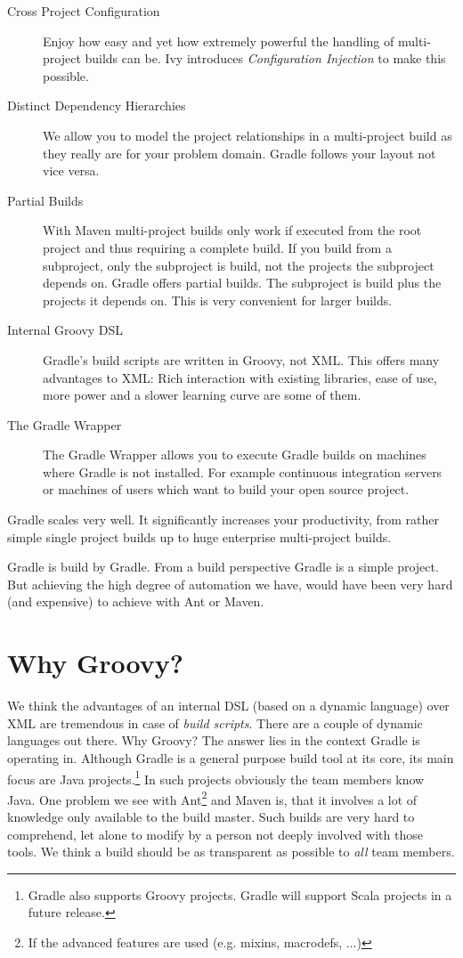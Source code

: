 \begin{description}
	\item[Cross Project Configuration] Enjoy how easy and yet how extremely powerful the handling of multi-project builds can be. Ivy introduces \emph{Configuration Injection} to make this possible. 
	\item[Distinct Dependency Hierarchies] We allow you to model the project relationships in a multi-project build as they really are for your problem domain. Gradle follows your layout not vice versa.
	\item[Partial Builds] With Maven multi-project builds only work if executed from the root project and thus requiring a complete build. If you build from a subproject, only the subproject is build, not the projects the subproject depends on. Gradle offers partial builds. The subproject is build plus the projects it depends on. This is very convenient for larger builds.    	
	\item[Internal Groovy DSL] Gradle's build scripts are written in Groovy, not XML. This offers many  advantages to XML: Rich interaction with existing libraries, ease of use, more power and a slower learning curve are some of them.
    \item[The Gradle Wrapper] The Gradle Wrapper allows you to execute Gradle builds on machines where Gradle is not installed. For example continuous integration servers or machines of users which want to build your open source project.          
\end{description}
Gradle scales very well. It significantly increases your productivity, from rather simple single project builds up to huge enterprise multi-project builds. 

Gradle is build by Gradle. From a build perspective Gradle is a simple project. But achieving the high degree of automation we have, would have been very hard (and expensive) to achieve with Ant or Maven.

\section{Why Groovy?} %
\label{sec:why_groovy}
We think the advantages of an internal DSL (based on a dynamic language) over XML are tremendous in case of \emph{build scripts}. There are a couple of dynamic languages out there. Why Groovy? The answer lies in the context Gradle is operating in. Although Gradle is a general purpose build tool at its core, its main focus are Java projects.\footnote{Gradle also supports Groovy projects. Gradle will support Scala projects in a future release.} In such projects obviously the team members know Java. One problem we see with Ant\footnote{If the advanced features are used (e.g. mixins, macrodefs, ...)} and Maven is, that it involves a lot of knowledge only available to the build master. Such builds are very hard to comprehend, let alone to modify by a person not deeply involved with those tools. We think a build should be as transparent as possible to \emph{all} team members. 

